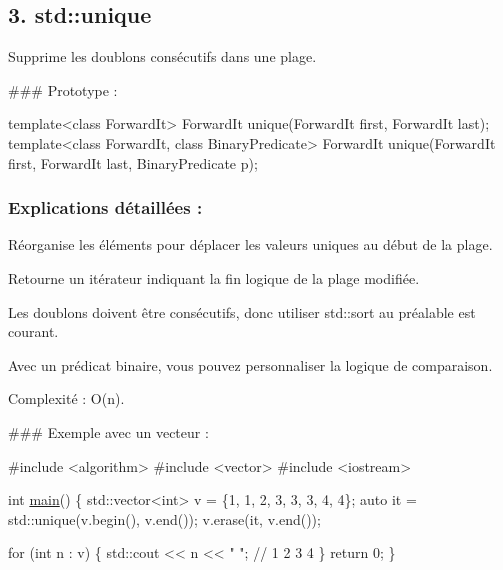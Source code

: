 \subsection*{3. {\bfseries std\+::unique}}

Supprime les doublons consécutifs dans une plage.

\#\#\# Prototype \+: 
\begin{DoxyCode}
\textcolor{keyword}{template}<\textcolor{keyword}{class} ForwardIt>
ForwardIt unique(ForwardIt first, ForwardIt last);
\textcolor{keyword}{template}<\textcolor{keyword}{class} ForwardIt, \textcolor{keyword}{class} BinaryPredicate>
ForwardIt unique(ForwardIt first, ForwardIt last, BinaryPredicate p);
\end{DoxyCode}


\subsubsection*{Explications détaillées \+:}


\begin{DoxyItemize}
\item Réorganise les éléments pour déplacer les valeurs uniques au début de la plage.
\item Retourne un itérateur indiquant la fin logique de la plage modifiée.
\item Les doublons doivent être consécutifs, donc utiliser {\ttfamily std\+::sort} au préalable est courant.
\item Avec un prédicat binaire, vous pouvez personnaliser la logique de comparaison.
\item Complexité \+: O(n).
\end{DoxyItemize}

\#\#\# Exemple avec un vecteur \+: 
\begin{DoxyCode}
\textcolor{preprocessor}{#include <algorithm>}
\textcolor{preprocessor}{#include <vector>}
\textcolor{preprocessor}{#include <iostream>}

\textcolor{keywordtype}{int} \hyperlink{htop_8c_a3c04138a5bfe5d72780bb7e82a18e627}{main}() \{
    std::vector<int> v = \{1, 1, 2, 3, 3, 3, 4, 4\};
    \textcolor{keyword}{auto} it = std::unique(v.begin(), v.end());
    v.erase(it, v.end());

    \textcolor{keywordflow}{for} (\textcolor{keywordtype}{int} n : v) \{
        std::cout << n << \textcolor{stringliteral}{" "}; \textcolor{comment}{// 1 2 3 4}
    \}
    \textcolor{keywordflow}{return} 0;
\}
\end{DoxyCode}
 



